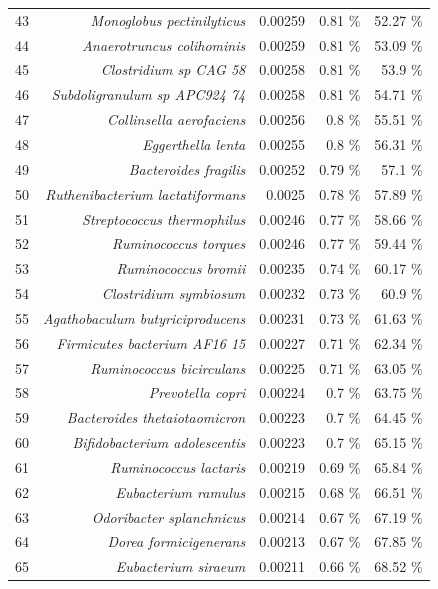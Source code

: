 \documentclass{article}
\begin{document}
\begin{table}[h]
\begin{centering}
\begin{tabular}{|r|r|r|r|r|}
      43 & \textit{Monoglobus pectinilyticus} & 0.00259 & 0.81 \% & 52.27 \% \\
      44 & \textit{Anaerotruncus colihominis} & 0.00259 & 0.81 \% & 53.09 \% \\
      45 & \textit{Clostridium sp CAG 58} & 0.00258 & 0.81 \% & 53.9 \% \\
      46 & \textit{Subdoligranulum sp APC924 74} & 0.00258 & 0.81 \% & 54.71 \% \\
      47 & \textit{Collinsella aerofaciens} & 0.00256 & 0.8 \% & 55.51 \% \\
      48 & \textit{Eggerthella lenta} & 0.00255 & 0.8 \% & 56.31 \% \\
      49 & \textit{Bacteroides fragilis} & 0.00252 & 0.79 \% & 57.1 \% \\
      50 & \textit{Ruthenibacterium lactatiformans} & 0.0025 & 0.78 \% & 57.89 \% \\
      51 & \textit{Streptococcus thermophilus} & 0.00246 & 0.77 \% & 58.66 \% \\
      52 & \textit{Ruminococcus torques} & 0.00246 & 0.77 \% & 59.44 \% \\
      53 & \textit{Ruminococcus bromii} & 0.00235 & 0.74 \% & 60.17 \% \\
      54 & \textit{Clostridium symbiosum} & 0.00232 & 0.73 \% & 60.9 \% \\
      55 & \textit{Agathobaculum butyriciproducens} & 0.00231 & 0.73 \% & 61.63 \% \\
      56 & \textit{Firmicutes bacterium AF16 15} & 0.00227 & 0.71 \% & 62.34 \% \\
      57 & \textit{Ruminococcus bicirculans} & 0.00225 & 0.71 \% & 63.05 \% \\
      58 & \textit{Prevotella copri} & 0.00224 & 0.7 \% & 63.75 \% \\
      59 & \textit{Bacteroides thetaiotaomicron} & 0.00223 & 0.7 \% & 64.45 \% \\
      60 & \textit{Bifidobacterium adolescentis} & 0.00223 & 0.7 \% & 65.15 \% \\
      61 & \textit{Ruminococcus lactaris} & 0.00219 & 0.69 \% & 65.84 \% \\
      62 & \textit{Eubacterium ramulus} & 0.00215 & 0.68 \% & 66.51 \% \\
      63 & \textit{Odoribacter splanchnicus} & 0.00214 & 0.67 \% & 67.19 \% \\
      64 & \textit{Dorea formicigenerans} & 0.00213 & 0.67 \% & 67.85 \% \\
      65 & \textit{Eubacterium siraeum} & 0.00211 & 0.66 \% & 68.52 \% \\

\end{tabular}
\end{centering}
\end{table}
\end{document}
